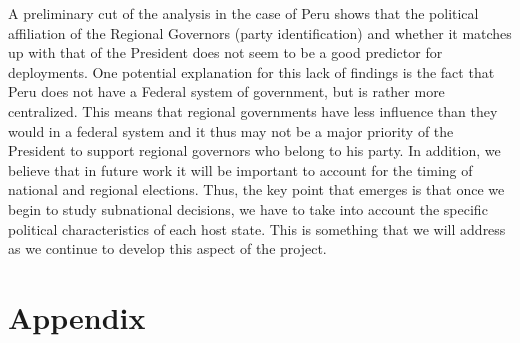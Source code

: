 \documentclass[12pt]{article}
\begin{document}
\begin{doublespace}
A preliminary cut of the analysis in the case of Peru shows that the political affiliation of the Regional Governors (party identification) and whether it matches up with that of the President does not seem to be a good predictor for deployments.  One potential explanation for this lack of findings is the fact that Peru does not have a Federal system of government, but is rather more centralized. This means that regional governments have less influence than they would in a federal system and it thus may not be a major priority of the President to support regional governors who belong to his party.  In addition, we believe that in future work it will be important to account for the timing of national and regional elections.  Thus, the key point that emerges is that once we begin to study subnational decisions, we have to take into account the specific political characteristics of each host state.  This is something that we will address as we continue to develop this aspect of the project.       

\end{doublespace}

\clearpage





%
%
\clearpage
%
%
%
\appendix
\section*{Appendix} 
\setcounter{table}{0}
\renewcommand{\thetable}{A\arabic{table}}
\setcounter{figure}{0}
\renewcommand{\thefigure}{A\arabic{figure}}
%
\listoftables
\listoffigures
%
%
\end{document}
